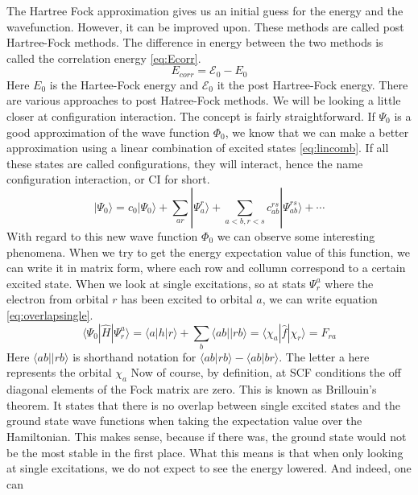 \documentclass[twoside,twocolumn,9pt]{article}
\begin{document}
The Hartree Fock approximation gives us an initial guess for the energy and the wavefunction. However, it can be improved upon. These methods are called post Hartree-Fock methods.
The difference in energy between the two methods is called the correlation energy \eqref{eq:Ecorr}.
\begin{equation}\label{eq:Ecorr}
  E_{corr} = \mathcal{E}_0 - E_0
\end{equation}
Here $E_0$ is the Hartee-Fock energy and $\mathcal{E}_0$ it the post Hartree-Fock energy. There are various approaches to post Hatree-Fock methods. We will be looking a little closer
at configuration interaction. The concept is fairly straightforward. If $\Psi_0$ is a good approximation of the wave function $\Phi_0$, we know that we can make a better approximation
using a linear combination of excited states \eqref{eq:lincomb}\cite{Szabo1996}. If all these states are called configurations, they will interact, hence the name configuration
interaction, or CI for short.
\begin{equation}\label{eq:lincomb}
  |\Psi_0\rangle = c_0|\Psi_0\rangle + \sum_{ar}|\Psi_a^r\rangle + \sum_{a<b,r<s}c_{ab}^{rs}|\Psi^{rs}_{ab} \rangle + \cdots
\end{equation}
With regard to this new wave function $\Phi_0$ we can observe some interesting phenomena. When we try to get the energy expectation value of this function, we can write it in matrix
form, where each row and collumn correspond to a certain excited state. When we look at single excitations, so at stats $\Psi_r^a$ where the electron from orbital $r$ has been
excited to orbital $a$, we can write equation \eqref{eq:overlapsingle}\cite{Szabo1996}.
\begin{equation}\label{eq:overlapsingle}
  \langle\Psi_0 |\hat{H}|\Psi_r^a\rangle = \langle a|h|r \rangle + \sum_b \langle ab||rb \rangle = \langle \chi_a |\hat{f}| \chi_r \rangle = F_{ra}
\end{equation}
Here $\langle ab||rb \rangle$ is shorthand notation for $\langle ab | rb \rangle - \langle ab | br \rangle$. The letter a here represents the orbital $\chi_a$
Now of course, by definition, at SCF conditions the off diagonal elements of the Fock matrix are zero. This is known as Brillouin's theorem. It states that there is no overlap
between single excited states and the ground state wave functions when taking the expectation value over the Hamiltonian. This makes sense, because if there was, the ground state
would not be the most stable in the first place. What this means is that when only looking at single excitations, we do not expect to see the energy lowered. And indeed, one can
\end{document}
